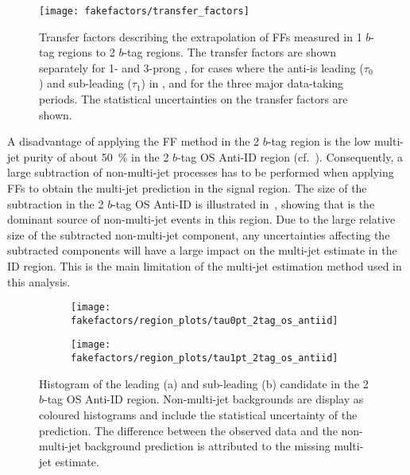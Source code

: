 \begin{figure}[htbp]
  \centering

  \texttt{[image: fakefactors/transfer\_factors]}

  \caption{Transfer factors describing the extrapolation of FFs measured in 1
    $b$-tag regions to 2 $b$-tag regions. The transfer factors are shown
    separately for 1- and 3-prong \tauhadvis, for cases where the
    anti-\tauhadvis is leading ($\tau_0$) and sub-leading ($\tau_1$) in \pT, and
    for the three major data-taking periods.  The statistical uncertainties on
    the transfer factors are shown.}%
  \label{fig:mjfakes_transfer_factor}
\end{figure}

A disadvantage of applying the FF method in the 2 $b$-tag region is the low
multi-jet purity of about \SI{50}{\percent} in the 2 $b$-tag OS Anti-ID region
(cf.\ ). Consequently, a large subtraction of
non-multi-jet processes has to be performed when applying FFs to obtain the
multi-jet prediction in the signal region.  The size of the subtraction in the 2
$b$-tag OS Anti-ID is illustrated in~, showing
that \ttbarFakes is the dominant source of non-multi-jet events in this
region. Due to the large relative size of the subtracted non-multi-jet
component, any uncertainties affecting the subtracted components will have a
large impact on the multi-jet estimate in the ID region. This is the main
limitation of the multi-jet estimation method used in this analysis.

\begin{figure}[htbp]
  \centering

  \begin{subfigure}{0.49\textwidth}
    \texttt{[image: fakefactors/region\_plots/tau0pt\_2tag\_os\_antiid]}
    \subcaption{}
  \end{subfigure}
  \begin{subfigure}{0.49\textwidth}
    \texttt{[image: fakefactors/region\_plots/tau1pt\_2tag\_os\_antiid]}
    \subcaption{}
  \end{subfigure}

  \caption{Histogram of the leading (a) and sub-leading (b) \tauhadvis
    candidate \pT in the 2 $b$-tag OS Anti-ID region. Non-multi-jet
    backgrounds are display as coloured histograms and include the
    statistical uncertainty of the prediction. The difference between
    the observed data and the non-multi-jet background prediction is
    attributed to the missing multi-jet estimate.}%
  \label{fig:mjfakes_2tag_os_antiid}
\end{figure}


